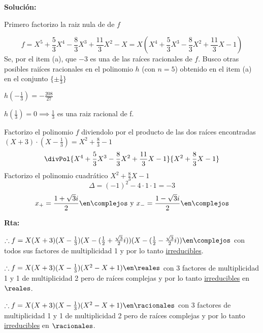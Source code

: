\begin{enumerate}[label=\alph*)]
        \textbf{Solución:}\par

        Primero factorizo la raiz nula de de $f$ \par
        $$
          f=X^5 + \frac{5}{3}X^4 - \frac{8}{3}X^3 + \frac{11}{3}X^2 - X =
          X(X^4 + \frac{5}{3}X^3 - \frac{8}{3}X^2 + \frac{11}{3}X - 1)
        $$
        Se, por el item (a), que $-3$ es una de las raíces racionales de $f$.
        Busco otras posibles raiíces racionales en el polinomio $h$ (con $n=5$)
        obtenido en el item (a) en el conjunto $\{ \pm\frac{1}{3} \}$ \par
        $h(-\frac{1}{3})=-\frac{208}{27}$ \par
        $h(\frac{1}{3})=0 \implies \frac{1}{3}$ es una raiz racional de f. \par

        Factorizo el polinomio $f$ diviendolo por el producto de las dos raíces
        encontradas $(X+3)\cdot(X-\frac{1}{3}) = X^2 + \frac{8}{3} - 1$
        $$
          \divPol{X^4 + \frac{5}{3}X^3 - \frac{8}{3}X^2 + \frac{11}{3}X - 1}{X^2 + \frac{8}{3}X - 1}
        $$
        Factorizo el polinomio cuadrático $X^2 + \frac{8}{3}X - 1$
        $$ \Delta = (-1)^2 - 4 \cdot 1 \cdot 1=-3 $$
        $$ x_+ = \frac{1 + \sqrt 3 i}{2} \en\complejos \text{ y } x_- = \frac{1 - \sqrt 3 i}{2} \en\complejos $$

        \textbf{Rta:}\par
        $\therefore f = X(X+3)( X - \frac{1}{3} )( X - (\frac{1}{2} + \frac{\sqrt 3}{2}i) )( X - (\frac{1}{2} - \frac{\sqrt 3}{2}i) ) \en \complejos$
        con todos sus factores de multiplicidad 1 y por lo tanto \hyperlink{teoria-7:irreducibles}{irreducibles}. \par
        $\therefore f = X(X+3)( X - \frac{1}{3} )(X^2-X+1) \en \reales$
        con 3 factores de multiplicidad 1 y 1 de multiplicidad 2 pero de raíces complejas
        y por lo tanto \hyperlink{teoria-7:irreducibles}{irreducibles} en $\reales$. \par
        $\therefore f = X(X+3)( X - \frac{1}{3} )(X^2-X+1) \en \racionales$
        con 3 factores de multiplicidad 1 y 1 de multiplicidad 2 pero de raíces complejas
        y por lo tanto \hyperlink{teoria-7:irreducibles}{irreducibles} en $\racionales$.
\end{enumerate}











